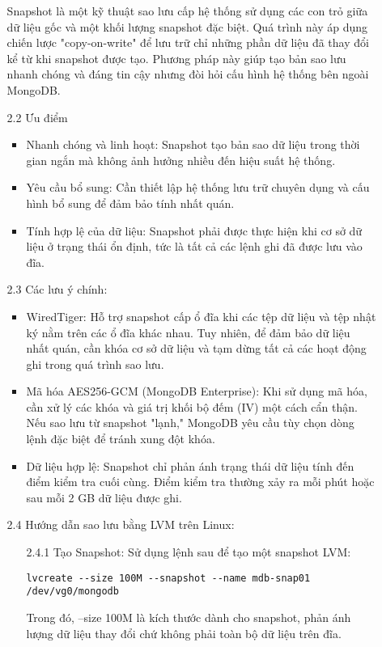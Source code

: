 \begin{enumerate}
\begin{enumerate}
    \hspace{1cm}Snapshot là một kỹ thuật sao lưu cấp hệ thống sử dụng các con trỏ giữa dữ liệu gốc và một khối lượng snapshot đặc biệt. Quá trình này áp dụng chiến lược "copy-on-write" để lưu trữ chỉ những phần dữ liệu đã thay đổi kể từ khi snapshot được tạo. Phương pháp này giúp tạo bản sao lưu nhanh chóng và đáng tin cậy nhưng đòi hỏi cấu hình hệ thống bên ngoài MongoDB.
    \item[2.2] Ưu điểm
    \begin{itemize}
        \item Nhanh chóng và linh hoạt: Snapshot tạo bản sao dữ liệu trong thời gian ngắn mà không ảnh hưởng nhiều đến hiệu suất hệ thống.
        \item Yêu cầu bổ sung: Cần thiết lập hệ thống lưu trữ chuyên dụng và cấu hình bổ sung để đảm bảo tính nhất quán.
        \item Tính hợp lệ của dữ liệu: Snapshot phải được thực hiện khi cơ sở dữ liệu ở trạng thái ổn định, tức là tất cả các lệnh ghi đã được lưu vào đĩa.
    \end{itemize}
    \item[2.3] Các lưu ý chính:
    \begin{itemize}
        \item WiredTiger: Hỗ trợ snapshot cấp ổ đĩa khi các tệp dữ liệu và tệp nhật ký nằm trên các ổ đĩa khác nhau. Tuy nhiên, để đảm bảo dữ liệu nhất quán, cần khóa cơ sở dữ liệu và tạm dừng tất cả các hoạt động ghi trong quá trình sao lưu.
        \item Mã hóa AES256-GCM (MongoDB Enterprise): Khi sử dụng mã hóa, cần xử lý các khóa và giá trị khối bộ đếm (IV) một cách cẩn thận. Nếu sao lưu từ snapshot "lạnh," MongoDB yêu cầu tùy chọn dòng lệnh đặc biệt để tránh xung đột khóa.
        \item Dữ liệu hợp lệ: Snapshot chỉ phản ánh trạng thái dữ liệu tính đến điểm kiểm tra cuối cùng. Điểm kiểm tra thường xảy ra mỗi phút hoặc sau mỗi 2 GB dữ liệu được ghi.
    \end{itemize}
    \item[2.4] Hướng dẫn sao lưu bằng LVM trên Linux:
    \begin{enumerate}
        \item[2.4.1] Tạo Snapshot: Sử dụng lệnh sau để tạo một snapshot LVM:
\begin{lstlisting}
lvcreate --size 100M --snapshot --name mdb-snap01 /dev/vg0/mongodb
\end{lstlisting}
        \hspace{1cm}Trong đó, --size 100M là kích thước dành cho snapshot, phản ánh lượng dữ liệu thay đổi chứ không phải toàn bộ dữ liệu trên đĩa.

\end{enumerate}
\end{enumerate}
\end{enumerate}
